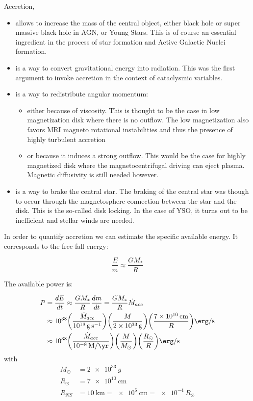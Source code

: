 \documentclass[10pt,a4paper,english,draft]{article}
\let\originalleft\left
\let\originalright\right
\renewcommand{\left}{\mathopen{}\mathclose\bgroup\originalleft}
\renewcommand{\right}{\aftergroup\egroup\originalright}
\begin{document}
Accretion,
\begin{itemize}
    \item allows to increase the mass of the central object, either black hole
          or super massive black hole in AGN, or Young Stars. This is of course
          an essential ingredient in the process of star formation and Active
          Galactic Nuclei formation.
    \item is a way to convert gravitational energy into radiation. This was the
          first argument to invoke accretion in the context of cataclysmic
          variables.
    \item is a way to redistribute angular momentum:
          \begin{itemize}
              \item either because of viscosity. This is thought to be the case
                    in low magnetization disk where there is no outflow. The
                    low magnetization also favors MRI magneto rotational
                    instabilities and thus the presence of highly turbulent
                    accretion
              \item or because it induces a strong outflow. This would be the
                    case for highly magnetized disk where the
                    magnetocentrifugal driving can eject plasma. Magnetic
                    diffusivity is still needed however.
          \end{itemize}
    \item is a way to brake the central star. The braking of the central star
          was though to occur through the magnetosphere connection between the
          star and the disk. This is the so-called disk locking. In the case of
          YSO, it turns out to be inefficient and stellar winds are needed.
\end{itemize}

In order to quantify accretion we can estimate the specific available energy.
It corresponds to the free fall energy:

\begin{equation}
  \frac{E}{m} \approx \frac{GM_*}{R}
\end{equation}

The available power is:

\begin{align}
P & = \frac{dE}{dt} \approx \frac{GM_*}{R} \frac{dm}{dt} = \frac{GM_*}{R} \dot{M}_{acc}
    \\
  &\approx \num{e38} \left(\frac{\dot{M}_{acc}}{\SI{e18}{\g\per\s}}\right) \left(\frac{M}{\SI{2e33}{\g}}\right) \left(\frac{\SI{7e10}{\cm}}{R}\right) \si{\erg\per\s}
    \\
  &\approx 10^{38} \left(\frac{\dot{M}_{acc}}{\SI{e-8}{M\per\yr}}\right) \left(\frac{M}{M_{\odot}}\right) \left(\frac{R_{\odot}}{R}\right) \si{\erg\per\s}
\end{align}
with
\begin{align}
  M_{\odot} &= \SI{2e33}{g} \\
  R_{\odot} &= \SI{7e10}{\cm} \\
  R_{NS}   &= \SI{10}{\km} = \SI{e6}{\cm} = \SI{e-4}{R_\odot}
\end{align}
\end{document}
